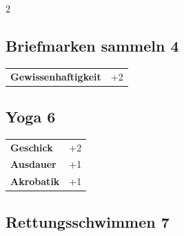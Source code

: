 \begin{multicols}{2}
\begin{tcolorbox}

\end{tcolorbox}

\begin{tcolorbox}
    \subsection*{Briefmarken sammeln \hfill \small{4 }}
    \tcblower




\begin{tabular}{@{}ll@{}}
    \textbf{Gewissenhaftigkeit} & +2\\
\end{tabular}


\end{tcolorbox}

\begin{tcolorbox}
    \subsection*{Yoga \hfill \small{6 }}
    \tcblower




\begin{tabular}{@{}ll@{}}
    \textbf{Geschick} & +2\\
    \textbf{Ausdauer} & +1\\
    \textbf{Akrobatik} & +1\\
\end{tabular}


\end{tcolorbox}

\begin{tcolorbox}
    \subsection*{Rettungsschwimmen \hfill \small{7 }}
    \tcblower





\end{tcolorbox}
\end{multicols}
